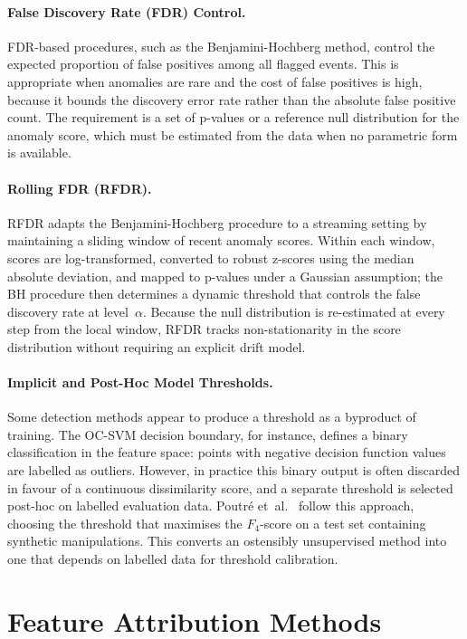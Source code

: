 \documentclass[11pt]{report}
\begin{document}
\paragraph{False Discovery Rate (FDR) Control.}
FDR-based procedures, such as the Benjamini-Hochberg method, control the expected proportion of false positives among all flagged events. This is appropriate when anomalies are rare and the cost of false positives is high, because it bounds the discovery error rate rather than the absolute false positive count. The requirement is a set of p-values or a reference null distribution for the anomaly score, which must be estimated from the data when no parametric form is available.

\paragraph{Rolling FDR (RFDR).}
RFDR adapts the Benjamini-Hochberg procedure to a streaming setting by maintaining a sliding window of recent anomaly scores. Within each window, scores are log-transformed, converted to robust z-scores using the median absolute deviation, and mapped to p-values under a Gaussian assumption; the BH procedure then determines a dynamic threshold that controls the false discovery rate at level~$\alpha$. Because the null distribution is re-estimated at every step from the local window, RFDR tracks non-stationarity in the score distribution without requiring an explicit drift model.

\paragraph{Implicit and Post-Hoc Model Thresholds.}
Some detection methods appear to produce a threshold as a byproduct of training. The OC-SVM decision boundary, for instance, defines a binary classification in the feature space: points with negative decision function values are labelled as outliers. However, in practice this binary output is often discarded in favour of a continuous dissimilarity score, and a separate threshold is selected post-hoc on labelled evaluation data. Poutr\'e et~al.~\cite{poutre_2024} follow this approach, choosing the threshold that maximises the $F_4$-score on a test set containing synthetic manipulations. This converts an ostensibly unsupervised method into one that depends on labelled data for threshold calibration.

\section{Feature Attribution Methods}\label{sec:background:attribution}
\end{document}
